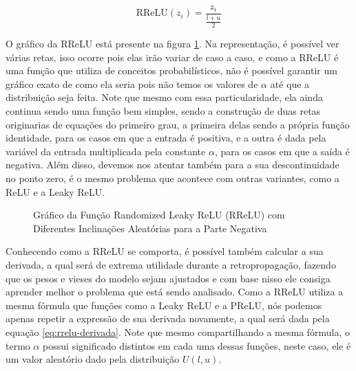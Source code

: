 \begin{equation}
    \text{RReLU}(z_i) = \frac{z_i}{\frac{l + u}{2}}
    \label{eq:equacao-rrelu-teste}
\end{equation}

O gráfico da RReLU está presente na figura \ref{fig:rrelu}. Na representação, é possível ver várias retas, isso ocorre pois elas irão variar de caso a caso, e como a RReLU é uma função que utiliza de conceitos probabilísticos, não é possível garantir um gráfico exato de como ela seria pois não temos os valores de $\alpha$ até que a distribuição seja feita. Note que mesmo com essa particularidade, ela ainda continua sendo uma função bem simples, sendo a construção de duas retas originarias de equações do primeiro grau, a primeira delas sendo a própria função identidade, para os casos em que a entrada é positiva, e a outra é dada pela variável da entrada multiplicada pela constante $\alpha$, para os casos em que a saída é negativa. Além disso, devemos nos atentar também para a sua descontinuidade no ponto zero, é o mesmo problema que acontece com outras variantes, como a ReLU e a Leaky ReLU.

\begin{figure}[h!]
    \centering
    \caption{Gráfico da Função Randomized Leaky ReLU (RReLU) com Diferentes Inclinações Aleatórias para a Parte Negativa}
    \label{fig:rrelu}
\end{figure}

Conhecendo como a RReLU se comporta, é possível também calcular a sua derivada, a qual será de extrema utilidade durante a retropropagação, fazendo que os pesos e vieses do modelo sejam ajustados e com base nisso ele consiga aprender melhor o problema que está sendo analisado. Como a RReLU utiliza a mesma fórmula que funções como a Leaky ReLU e a PReLU, nós podemos apenas repetir a expressão de sua derivada novamente, a qual será dada pela equação \ref{eq:rrelu-derivada}. Note que mesmo compartilhando a mesma fórmula, o termo $\alpha$ possui significado distintos em cada uma dessas funções, neste caso, ele é um valor aleatório dado pela distribuição $U(l, u)$.

